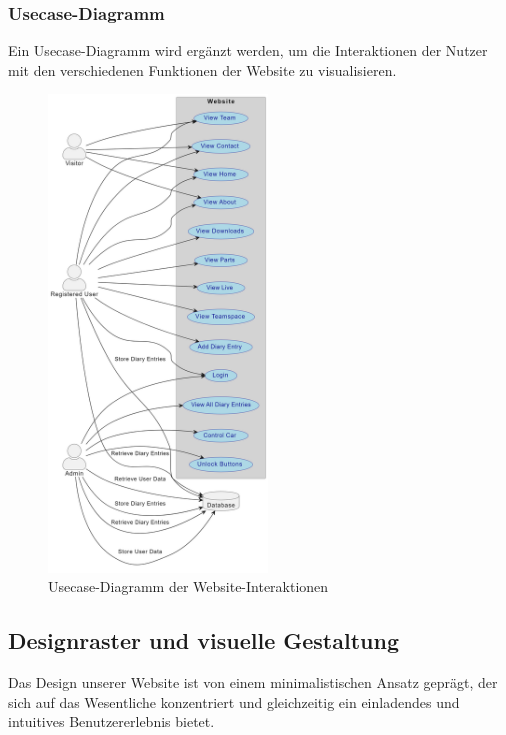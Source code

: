 \subsubsection{Usecase-Diagramm}
Ein Usecase-Diagramm wird ergänzt werden, um die Interaktionen der Nutzer mit den verschiedenen Funktionen der Website zu visualisieren. 

\newpage

\begin{figure}[h]
\centering
\includegraphics[width=0.52\textwidth]{Resources/diagram.png}
\caption{Usecase-Diagramm der Website-Interaktionen}
\end{figure}

\newpage

\subsection{Designraster und visuelle Gestaltung}

Das Design unserer Website ist von einem minimalistischen Ansatz geprägt, der sich auf das Wesentliche konzentriert und gleichzeitig ein einladendes und intuitives Benutzererlebnis bietet.

